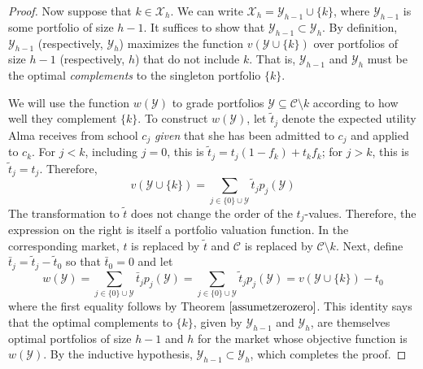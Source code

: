 \documentclass[12pt]{article} %
\theoremstyle{definition}
\theoremstyle{definition}
\begin{document}
\begin{proof}
Now suppose that $k \in \mathcal{X}_h$. We can write $\mathcal{X}_h = \mathcal{Y}_{h-1} \cup \{k\}$, where $ \mathcal{Y}_{h-1}$ is some portfolio of size $h-1$. It suffices to show that $ \mathcal{Y}_{h-1} \subset \mathcal{Y}_h$. By definition, $\mathcal{Y}_{h-1}$ (respectively, $\mathcal{Y}_{h}$) maximizes the function $v(\mathcal{Y}\cup\{k\})$ over portfolios of size $h-1$ (respectively, $h$) that do not include $k$. That is, $\mathcal{Y}_{h-1}$ and $\mathcal{Y}_h$ must be the optimal \emph{complements} to the singleton portfolio $\{k\}$.

We will use the function $w(\mathcal{Y})$ to grade portfolios $\mathcal{Y} \subseteq \mathcal{C} \setminus k$ according to how well they complement $\{k\}$. To construct $w(\mathcal{Y})$, let $\tilde t_j$ denote the expected utility Alma receives from school $c_j$ \emph{given} that she has been admitted to $c_j$ and applied to $c_k$. For $j < k$, including $j = 0$, this is $\tilde t_j = t_j (1- f_k) + t_k f_k$; for $j > k $, this is $\tilde t_j = t_j$. Therefore, 
\begin{equation}v(\mathcal{Y}\cup\{k\}) = \sum_{j \in \{0\} \cup \mathcal{Y}} \tilde t_j p_j(\mathcal{Y})\end{equation}
The transformation to $\tilde t$ does not change the order of the $t_j$-values. Therefore, the expression on the right is itself a portfolio valuation function. In the corresponding market, $t$ is replaced by $\tilde t$ and $\mathcal{C}$ is replaced by $\mathcal{C}\setminus k$. Next, define $\bar t_j = \tilde t_j - \tilde t_0$ so that $\bar t_0 = 0$ and let
\begin{equation}  \label{wYvXminusconst}
w(\mathcal{Y}) = \sum_{j \in \{0\} \cup \mathcal{Y}} \bar t_j p_j(\mathcal{Y}) =  \sum_{j \in \{0\} \cup \mathcal{Y}} \tilde t_j p_j(\mathcal{Y}) = v(\mathcal{Y}\cup\{k\}) - t_0 \end{equation}
where the first equality follows by Theorem $\ref{assumetzerozero}$. This identity says that the optimal complements to $\{k\}$, given by $\mathcal{Y}_{h-1}$ and $\mathcal{Y}_h$, are themselves optimal portfolios of size $h-1$ and $h$ for the market whose objective function is $w(\mathcal{Y})$. By the inductive hypothesis, $\mathcal{Y}_{h-1} \subset \mathcal{Y}_h$, which completes the proof. 

\end{proof}
\end{document}
